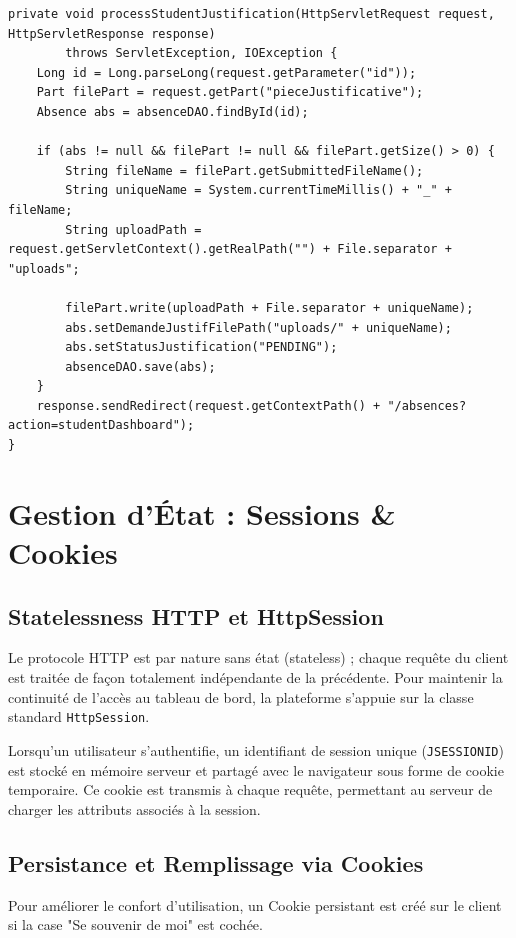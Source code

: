 \documentclass[12pt,a4paper]{article}
\begin{document}
\begin{lstlisting}[caption={Gestion de l'upload de justificatif dans AbsenceServlet.java}]
private void processStudentJustification(HttpServletRequest request, HttpServletResponse response)
        throws ServletException, IOException {
    Long id = Long.parseLong(request.getParameter("id"));
    Part filePart = request.getPart("pieceJustificative");
    Absence abs = absenceDAO.findById(id);

    if (abs != null && filePart != null && filePart.getSize() > 0) {
        String fileName = filePart.getSubmittedFileName();
        String uniqueName = System.currentTimeMillis() + "_" + fileName;
        String uploadPath = request.getServletContext().getRealPath("") + File.separator + "uploads";
        
        filePart.write(uploadPath + File.separator + uniqueName);
        abs.setDemandeJustifFilePath("uploads/" + uniqueName);
        abs.setStatusJustification("PENDING");
        absenceDAO.save(abs);
    }
    response.sendRedirect(request.getContextPath() + "/absences?action=studentDashboard");
}
\end{lstlisting}

\section{Gestion d'État : Sessions \& Cookies}

\subsection{Statelessness HTTP et HttpSession}
Le protocole HTTP est par nature sans état (stateless) ; chaque requête du client est traitée de façon totalement indépendante de la précédente. Pour maintenir la continuité de l'accès au tableau de bord, la plateforme s'appuie sur la classe standard \texttt{HttpSession}.

Lorsqu'un utilisateur s'authentifie, un identifiant de session unique (\texttt{JSESSIONID}) est stocké en mémoire serveur et partagé avec le navigateur sous forme de cookie temporaire. Ce cookie est transmis à chaque requête, permettant au serveur de charger les attributs associés à la session.

\subsection{Persistance et Remplissage via Cookies}
Pour améliorer le confort d'utilisation, un Cookie persistant est créé sur le client si la case "Se souvenir de moi" est cochée.
\end{document}
